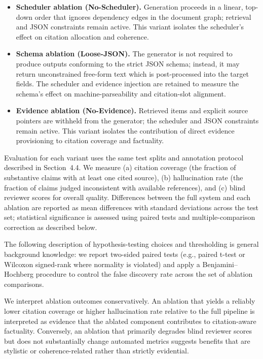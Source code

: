 \documentclass{article}%
\begin{document}
\begin{itemize}
  \item \textbf{Scheduler ablation (No-Scheduler).} Generation proceeds in a linear, top-down order that ignores dependency edges in the document graph; retrieval and JSON constraints remain active. This variant isolates the scheduler's effect on citation allocation and coherence.
  \item \textbf{Schema ablation (Loose-JSON).} The generator is not required to produce outputs conforming to the strict JSON schema; instead, it may return unconstrained free-form text which is post-processed into the target fields. The scheduler and evidence injection are retained to measure the schema's effect on machine-parseability and citation-slot alignment.
  \item \textbf{Evidence ablation (No-Evidence).} Retrieved items and explicit source pointers are withheld from the generator; the scheduler and JSON constraints remain active. This variant isolates the contribution of direct evidence provisioning to citation coverage and factuality.
\end{itemize}

Evaluation for each variant uses the same test splits and annotation protocol described in Section~4.4. We measure (a) citation coverage (the fraction of substantive claims with at least one cited source), (b) hallucination rate (the fraction of claims judged inconsistent with available references), and (c) blind reviewer scores for overall quality. Differences between the full system and each ablation are reported as mean differences with standard deviations across the test set; statistical significance is assessed using paired tests and multiple-comparison correction as described below.

The following description of hypothesis-testing choices and thresholding is general background knowledge: we report two-sided paired tests (e.g., paired t-test or Wilcoxon signed-rank where normality is violated) and apply a Benjamini--Hochberg procedure to control the false discovery rate across the set of ablation comparisons.

We interpret ablation outcomes conservatively. An ablation that yields a reliably lower citation coverage or higher hallucination rate relative to the full pipeline is interpreted as evidence that the ablated component contributes to citation-aware factuality. Conversely, an ablation that primarily degrades blind reviewer scores but does not substantially change automated metrics suggests benefits that are stylistic or coherence-related rather than strictly evidential.
\end{document}
